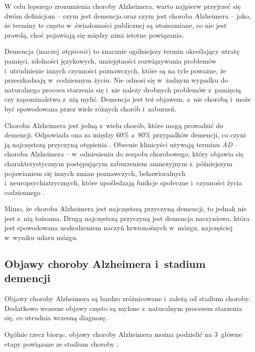 W celu lepszego zrozumienia choroby Alzheimera, warto najpierw przyjrzeć się dwóm definicjom -- czym jest demencja oraz czym jest choroba Alzheimera -- jako, że terminy te często w~świadomości publicznej są utożsamiane, co nie jest prawdą, choć pojawiają się między nimi istotne powiązania.

Demencja (inaczej \emph{otępienie}) to znacznie ogólniejszy termin określający utratę pamięci, zdolności językowych, umiejętności rozwiązywania problemów i~utrudnienie innych czynności poznawczych, które są na tyle poważne, że przeszkadzają w~codziennym życiu.
Nie odnosi się w~żadnym wypadku do naturalnego procesu starzenia się i~nie należy drobnych problemów z~pamięcią czy zapominalstwa z~nią mylić.
Demencja jest też objawem, a~nie chorobą i~może być spowodowana przez wiele różnych chorób i~zaburzeń.

Choroba Alzheimera jest jedną z~wielu chorób, które mogą prowadzić do demencji.
Odpowiada ona za między 60\% a~80\% przypadków demencji, co czyni ją najczęstszą przyczyną otępienia \cite{what-is-alzheimers:2023}.
Obecnie klinicyści używają terminu \emph{AD} -- choroba Alzheimera -- w~odniesieniu do zespołu chorobowego, który objawia się charakterystycznym postępującym zaburzeniem amnezyjnym z~późniejszym pojawianiem się innych zmian poznawczych, behawioralnych i~neuropsychiatrycznych, które upośledzają funkcje społeczne i~czynności życia codziennego \cite{cummings2004alzheimer}.

Mimo, że choroba Alzheimera jest najczęstszą przyczyną demencji, to jednak nie jest z~nią tożsama.
Drugą najczęstszą przyczyną jest demencja naczyniowa, która jest spowodowana uszkodzeniem naczyń krwionośnych w~mózgu, najczęściej w~wyniku udaru mózgu.


\subsection{Objawy choroby Alzheimera i~stadium demencji}

Objawy choroby Alzheimera są bardzo zróżnicowane i~zależą od stadium choroby.
Dodatkowo wczesne objawy często są mylone z~naturalnym procesem starzenia się, co utrudnia wczesną diagnozę.

Ogólnie rzecz biorąc, objawy choroby Alzheimera można podzielić na 3~główne etapy powiązane ze stadium choroby \cite{alzheimers-symptoms:2021}:

